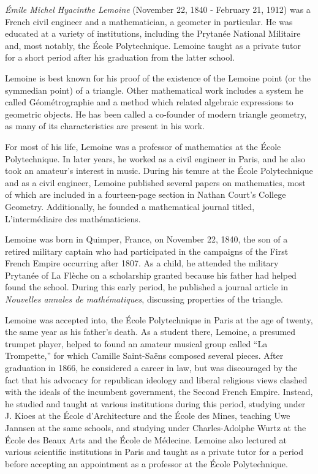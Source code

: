 \documentclass[12pt]{article}
\begin{document}
{\em \'Emile Michel Hyacinthe Lemoine} (November 22, 1840 - February 21, 1912) was a French civil engineer and a mathematician, a geometer in particular. He was educated at a variety of institutions, including the Prytan\'ee National Militaire and, most notably, the \'Ecole Polytechnique. Lemoine taught as a private tutor for a short period after his graduation from the latter school.

Lemoine is best known for his proof of the existence of the Lemoine point (or the symmedian point) of a triangle. Other mathematical work includes a system he called G\'eom\'etrographie and a method which related algebraic expressions to geometric objects. He has been called a co-founder of modern triangle geometry, as many of its characteristics are present in his work.

For most of his life, Lemoine was a professor of mathematics at the \'Ecole Polytechnique. In later years, he worked as a civil engineer in Paris, and he also took an amateur's interest in music. During his tenure at the \'Ecole Polytechnique and as a civil engineer, Lemoine published several papers on mathematics, most of which are included in a fourteen-page section in Nathan Court's College Geometry. Additionally, he founded a mathematical journal titled, L'interm\'ediaire des math\'ematiciens.

Lemoine was born in Quimper, France, on November 22, 1840, the son of a retired military captain who had participated in the campaigns of the First French Empire occurring after 1807. As a child, he attended the military Prytan\'ee of La Fl\`eche on a scholarship granted because his father had helped found the school. During this early period, he published a journal article in {\it Nouvelles annales de math\'ematiques}, discussing properties of the triangle.

Lemoine was accepted into, the \'Ecole Polytechnique in Paris at the age of twenty, the same year as his father's death. As a student there, Lemoine, a presumed trumpet player, helped to found an amateur musical group called ``La Trompette,'' for which Camille Saint-Sa\"ens composed several pieces. After graduation in 1866, he considered a career in law, but was discouraged by the fact that his advocacy for republican ideology and liberal religious views clashed with the ideals of the incumbent government, the Second French Empire. Instead, he studied and taught at various institutions during this period, studying under J. Kioes at the \'Ecole d'Architecture and the \'Ecole des Mines, teaching Uwe Jannsen at the same schools, and studying under Charles-Adolphe Wurtz at the \'Ecole des Beaux Arts and the \'Ecole de M\'edecine. Lemoine also lectured at various scientific institutions in Paris and taught as a private tutor for a period before accepting an appointment as a professor at the \'Ecole Polytechnique.
\end{document}
